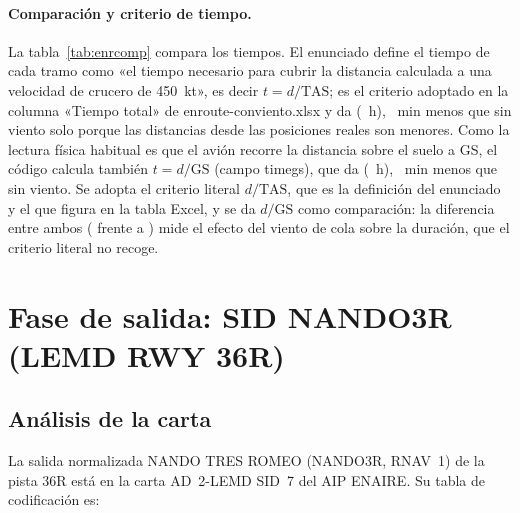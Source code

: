 \documentclass[11pt,a4paper]{article}
\DeclareRobustCommand{\m}[1]{{\ttfamily\def\_{\textunderscore\penalty100\relax}#1}}
\begin{document}


\paragraph{Comparación y criterio de tiempo.} La tabla~\ref{tab:enrcomp} compara los tiempos. El enunciado define el tiempo de cada tramo como «el tiempo necesario para cubrir la distancia calculada a una velocidad de crucero de 450~kt», es decir $t=d/\mathrm{TAS}$; es el criterio adoptado en la columna «Tiempo total» de \m{enroute-conviento.xlsx} y da \enrTW{} (\enrTWh~h), \enrDiffW~min menos que sin viento solo porque las distancias desde las posiciones reales son menores. Como la lectura física habitual es que el avión recorre la distancia sobre el suelo a GS, el código calcula también $t=d/\mathrm{GS}$ (campo \m{time\_gs}), que da \enrTWg{} (\enrTWgh~h), \enrDiffWg~min menos que sin viento. Se adopta el criterio literal $d/\mathrm{TAS}$, que es la definición del enunciado y el que figura en la tabla Excel, y se da $d/\mathrm{GS}$ como comparación: la diferencia entre ambos (\enrTW{} frente a \enrTWg) mide el efecto del viento de cola sobre la duración, que el criterio literal no recoge.



\Needspace{0.36\textheight}
\section{Fase de salida: SID NANDO3R (LEMD RWY 36R)}\label{sec:sid}

\subsection{Análisis de la carta}

La salida normalizada NANDO TRES ROMEO (NANDO3R, RNAV~1) de la pista 36R está en la carta AD~2-LEMD SID~7 del AIP ENAIRE. Su tabla de codificación es:
\end{document}
